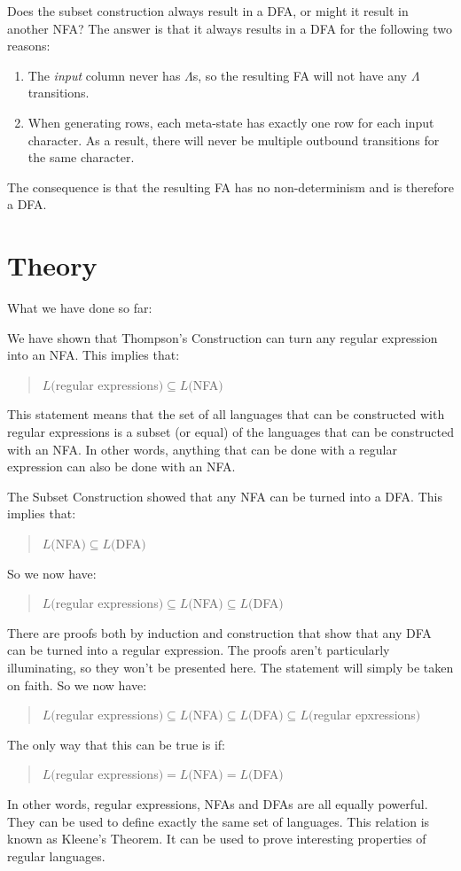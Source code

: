 \documentclass[letterpaper,12pt,openany,reqno]{book}%
\begin{document}
Does the subset construction always result in a DFA, or might it result in another NFA? The answer is that it always results in a DFA for the following two reasons:
\begin{enumerate}
\item The \emph{input} column never has $\Lambda$s, so the resulting FA will not have any $\Lambda$ transitions.
\item When generating rows, each meta-state has exactly one row for each input character. As a result, there will never be multiple outbound transitions for the same character.
\end{enumerate}
The consequence is that the resulting FA has no non-determinism and is therefore a DFA.

\chapter{Theory}

What we have done so far:

We have shown that Thompson's Construction can turn any regular expression into an NFA. This implies that:
\begin{quote}
$L($regular expressions$) \subseteq L($NFA$)$
\end{quote}
This statement means that the set of all languages that can be constructed with regular expressions is a subset (or equal) of the languages that can be constructed with an NFA. In other words, anything that can be done with a regular expression can also be done with an NFA.

The Subset Construction showed that any NFA can be turned into a DFA. This implies that:
\begin{quote}
$L($NFA$) \subseteq L($DFA$)$
\end{quote}
So we now have:
\begin{quote}
$L($regular expressions$) \subseteq L($NFA$) \subseteq L($DFA$)$
\end{quote}

There are proofs both by induction and construction that show that any DFA can be turned into a regular expression. The proofs aren't particularly illuminating, so they won't be presented here. The statement will simply be taken on faith. So we now have:

\begin{quote}
$L($regular expressions$) \subseteq L($NFA$) \subseteq L($DFA$) \subseteq L($regular epxressions$)$
\end{quote}
The only way that this can be true is if:
\begin{quote}
$L($regular expressions$) = L($NFA$) = L($DFA$)$
\end{quote}
In other words, regular expressions, NFAs and DFAs are all equally powerful. They can be used to define exactly the same set of languages. This relation is known as Kleene's Theorem. It can be used to prove interesting properties of regular languages. 
\end{document}
